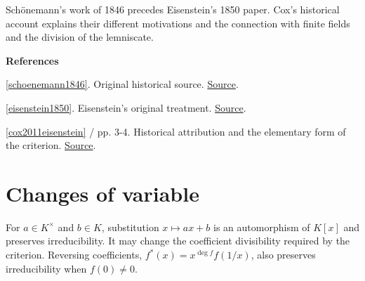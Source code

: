 \documentclass[11pt,a4paper,oneside,openany]{book}
\newenvironment{sources}{\par\smallskip\begingroup\footnotesize\color{atlasgray}\leftskip=10pt\setlength{\parskip}{2pt}}{\par\endgroup\smallskip}
\begin{document}
\color{black} Schönemann's work of 1846 precedes Eisenstein's 1850 paper. Cox's historical account explains their different motivations and the connection with finite fields and the division of the lemniscate.\par
\begin{sources}
\textbf{References}\par\smallskip
\noindent\hyperlink{ref:schoenemann1846}{[schoenemann1846]}. Original historical source. \href{https://www.degruyterbrill.com/document/doi/10.1515/crll.1846.32.93/html}{Source}.\par
\noindent\hyperlink{ref:eisenstein1850}{[eisenstein1850]}. Eisenstein's original treatment. \href{https://doi.org/10.1515/crll.1850.39.160}{Source}.\par
\noindent\hyperlink{ref:cox2011eisenstein}{[cox2011eisenstein]} / pp. 3-4. Historical attribution and the elementary form of the criterion. \href{https://people.math.ethz.ch/~halorenz/4students/Algebra/Schoenemann_Eisenstein.pdf}{Source}.\par
\end{sources}\color{black}
\section{Changes of variable}
\color{black} For \(a\in K^\times\) and \(b\in K\), substitution \(x\mapsto ax+b\) is an automorphism of \(K[x]\) and preserves irreducibility. It may change the coefficient divisibility required by the criterion. Reversing coefficients, \(f^*(x)=x^{\deg f}f(1/x)\), also preserves irreducibility when \(f(0)\ne0\).\par
\end{document}

